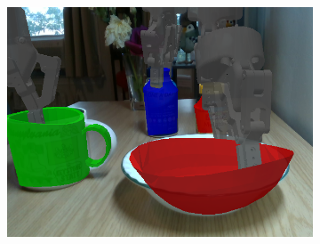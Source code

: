 \documentclass{article}
\begin{document}
\begin{figure}[]
\begin{subfigure}{(\linewidth - 0.05\linewidth)/5}
        \includegraphics[width=\linewidth]{figures/real2sim2real/3/4.png}
    \end{subfigure}


\end{figure}
\end{document}
